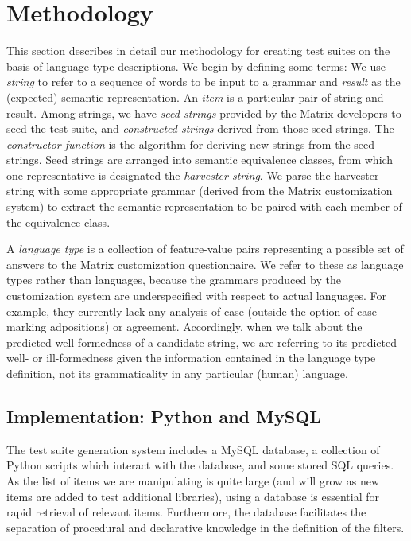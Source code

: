 \documentclass[11pt]{article}
\begin{document}
\section{Methodology}
\label{arch}

This section describes in detail our methodology for creating
test suites on the basis of language-type descriptions.  We begin
by defining some terms:  We use {\it string} to refer to a sequence
of words to be input to a grammar and {\it result} as the (expected)
semantic representation.  An {\it item} is a particular pair of
string and result.  Among strings, we have {\it seed strings} provided
by the Matrix developers to seed the test suite, and {\it constructed
strings} derived from those seed strings.  The {\it constructor function} 
is the algorithm for deriving new strings from the seed strings. Seed
strings are arranged into semantic equivalence classes, from which one
representative is designated the {\it harvester string}.  We parse
the harvester string with some appropriate grammar (derived from
the Matrix customization system) to extract the semantic representation
to be paired with each member of the equivalence class.

A {\it language type} is a collection of feature-value pairs
representing a possible set of answers to the Matrix customization
questionnaire.  We refer to these as language types rather than
languages, because the grammars produced by the customization system
are underspecified with respect to actual languages.  For example,
they currently lack any analysis of case (outside the option of
case-marking adpositions) or agreement.  
Accordingly, when we talk
about the predicted well-formedness of a candidate string, we are
referring to its predicted well- or ill-formedness given the
information contained in the language type definition, not its
grammaticality in any particular (human) language.

\subsection{Implementation: Python and MySQL}

The test suite generation system includes a MySQL database, a collection
of Python scripts which interact with the database, and some stored
SQL queries.  As the list of items we are manipulating is quite large
(and will grow as new items are added to test additional libraries),
using a database is essential for rapid retrieval of relevant items.
Furthermore, the database facilitates the separation of procedural
and declarative knowledge in the definition of the filters.
\end{document}
